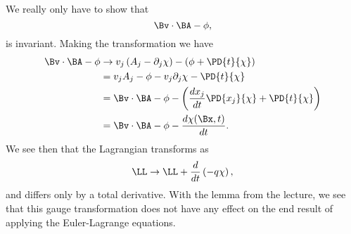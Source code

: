 {%
%
We really only have to show that
%
\begin{equation}\label{eqn:classicalMechanicsPs1:140}
\Bv \cdot \BA - \phi,
\end{equation}
%
is invariant.  Making the transformation we have
%
\begin{equation}\label{eqn:classicalMechanicsPs1:600}
\begin{aligned}
\Bv \cdot \BA - \phi
&\rightarrow
v_j \left(A_j - \partial_j \chi \right) - \left(\phi + \PD{t}{\chi} \right) \\
&=
v_j A_j - \phi - v_j \partial_j \chi - \PD{t}{\chi} \\
&=
\Bv \cdot \BA - \phi
- \left( \frac{d x_j}{dt} \PD{x_j}{\chi} + \PD{t}{\chi} \right) \\
&=
\Bv \cdot \BA - \phi
- \frac{d \chi(\Bx, t)}{dt}.
\end{aligned}
\end{equation}
%
We see then that the Lagrangian transforms as
%
\begin{equation}\label{eqn:classicalMechanicsPs1:160}
\LL \rightarrow \LL + \frac{d}{dt}\left( -q \chi \right),
\end{equation}
%
and differs only by a total derivative.  With the lemma from the lecture, we see that this gauge transformation does not have any effect on the end result of applying the Euler-Lagrange equations.
} %
